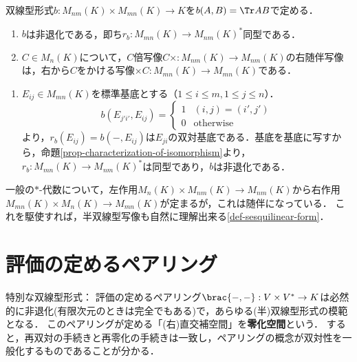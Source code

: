 \documentclass[uplatex, dvipdfmx]{jsreport}
\begin{document}
\begin{proposition}[随伴は作用の方向を変えることに相当する]
    双線型形式$b:M_{nm}(K)\times M_{mn}(K)\to K$を$b(A,B)=\Tr AB$で定める．
    \begin{enumerate}
        \item $b$は非退化である，即ち$r_b:M_{mn}(K)\to M_{nm}(K)^*$同型である．
        \item $C\in M_n(K)$について，$C$倍写像$C\times:M_{nm}(K)\to M_{nm}(K)$の右随伴写像は，右から$C$をかける写像$\times C:M_{mn}(K)\to M_{mn}(K)$である．
    \end{enumerate}
\end{proposition}
\begin{Proof}\mbox{}
    \begin{enumerate}
        \item $E_{ij}\in M_{mn}(K)$を標準基底とする（$1\le i\le m,1\le j\le n$）．
        \[b(E_{j'i'},E_{ij})=\begin{cases}
            1&(i,j)=(i',j')\\
            0&\mathrm{otherwise}
        \end{cases}\]
        より，$r_b(E_{ij})=b(-,E_{ij})$は$E_{ji}$の双対基底である．基底を基底に写すから，命題\ref{prop-characterization-of-isomorphism}より，$r_b:M_{mn}(K)\to M_{nm}(K)^*$は同型であり，$b$は非退化である．

    \end{enumerate}
\end{Proof}
\begin{remarks}
    一般の$*$-代数について，左作用$M_n(K)\times M_{nm}(K)\to M_{nm}(K)$から右作用$M_{mn}(K)\times M_{n}(K)\to M_{mn}(K)$が定まるが，これは随伴になっている．
    これを駆使すれば，半双線型写像も自然に理解出来る\ref{def-sesquilinear-form}．
\end{remarks}

\section{評価の定めるペアリング}

\begin{tcolorbox}[colframe=ForestGreen, colback=ForestGreen!10!white,breakable,colbacktitle=ForestGreen!40!white,coltitle=black,fonttitle=\bfseries\sffamily,
    title=]
    特別な双線型形式：
    評価の定めるペアリング$\brac{-,-}:V\times V^*\to K$は必然的に非退化(有限次元のときは完全でもある)で，あらゆる(半)双線型形式の模範となる．
    このペアリングが定める「(右)直交補空間」を\textbf{零化空間}という．
    すると，再双対の手続きと再零化の手続きは一致し，ペアリングの概念が双対性を一般化するものであることが分かる．
\end{tcolorbox}
\end{document}
